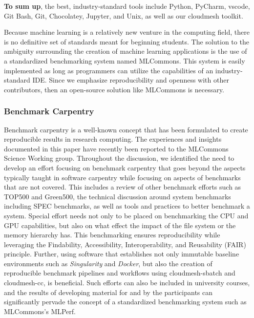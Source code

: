\documentclass[utf8]{FrontiersinVancouver} %
\begin{document}
{\bf To sum up}, the best, industry-standard tools include Python, PyCharm, vscode, Git Bash, Git, Chocolatey, Jupyter, and Unix, as well as our cloudmesh toolkit.

Because machine learning is a relatively new venture in the computing field, there is no definitive set of standards meant for beginning students. The solution to the ambiguity surrounding the creation of machine learning applications is the use of a standardized benchmarking system named MLCommons. This system is easily implemented as long as programmers can utilize the capabilities of an industry-standard IDE. Since we emphasize reproducibility and openness with other contributors, then an open-source solution like MLCommons is necessary.



\subsubsection{Benchmark Carpentry}

Benchmark carpentry is a well-known concept that has been formulated to create reproducible results in research computing.  The experiences and insights documented in this paper have recently been reported to the MLCommons Science Working group. Throughout the discussion, we identified the need to develop an effort focusing on benchmark carpentry that goes beyond the aspects typically taught in software carpentry while focusing on aspects of benchmarks that are not covered. This includes a review of other benchmark efforts such as TOP500 and Green500, the technical discussion around system benchmarks including SPEC benchmarks, as well as tools and practices to better benchmark a system. Special effort needs not only to be placed on benchmarking the CPU and GPU capabilities, but also on what effect the impact of the file system or the memory hierarchy has. This benchmarking ensures reproducibility while leveraging the Findability, Accessibility, Interoperability, and Reusability (FAIR) principle. Further, using software that establishes not only immutable baseline environments such as {\em Singularity} and {\em Docker}, but also the creation of reproducible benchmark pipelines and workflows using cloudmesh-sbatch and cloudmesh-cc, is beneficial. Such efforts can also be included in university courses, and the results of developing material for and by the participants can significantly pervade the concept of a standardized benchmarking system such as MLCommons's MLPerf.
\end{document}

